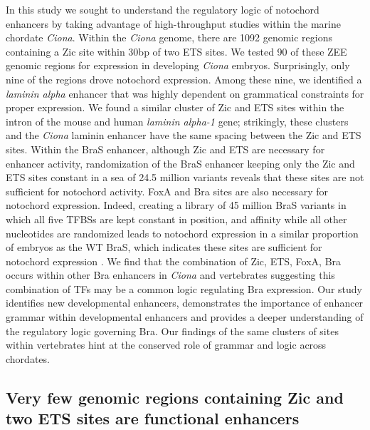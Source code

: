 In this study we sought to understand the regulatory logic of notochord enhancers by taking advantage of high-throughput studies within the marine chordate \textit{Ciona}. Within the \textit{Ciona} genome, there are 1092 genomic regions containing a Zic site within 30bp of two ETS sites. We tested 90 of these ZEE genomic regions for expression in developing \textit{Ciona} embryos. Surprisingly, only nine of the regions drove notochord expression. Among these nine, we identified a \textit{laminin alpha} enhancer that was highly dependent on grammatical constraints for proper expression. We found a similar cluster of Zic and ETS sites within the intron of the mouse and human \textit{laminin alpha-1} gene; strikingly, these clusters and the \textit{Ciona} laminin enhancer have the same spacing between the Zic and ETS sites. Within the BraS enhancer, although Zic and ETS are necessary for enhancer activity, randomization of the BraS enhancer keeping only the Zic and ETS sites constant in a sea of 24.5 million variants reveals that these sites are not sufficient for notochord activity. FoxA and Bra sites are also necessary for notochord expression. Indeed, creating a library of 45 million BraS variants in which all five TFBSs are kept constant in position, and affinity while all other nucleotides are randomized leads to notochord expression in a similar proportion of embryos as the WT BraS, which indicates these sites are sufficient for notochord expression . We find that the combination of Zic, ETS, FoxA, Bra occurs within other Bra enhancers in \textit{Ciona} and vertebrates suggesting this combination of TFs may be a common logic regulating Bra expression. Our study identifies new developmental enhancers, demonstrates the importance of enhancer grammar within developmental enhancers and provides a deeper understanding of the regulatory logic governing Bra. Our findings of the same clusters of sites within vertebrates hint at the conserved role of grammar and logic across chordates. 

\subsection{Very few genomic regions containing Zic and two ETS sites are functional enhancers}

